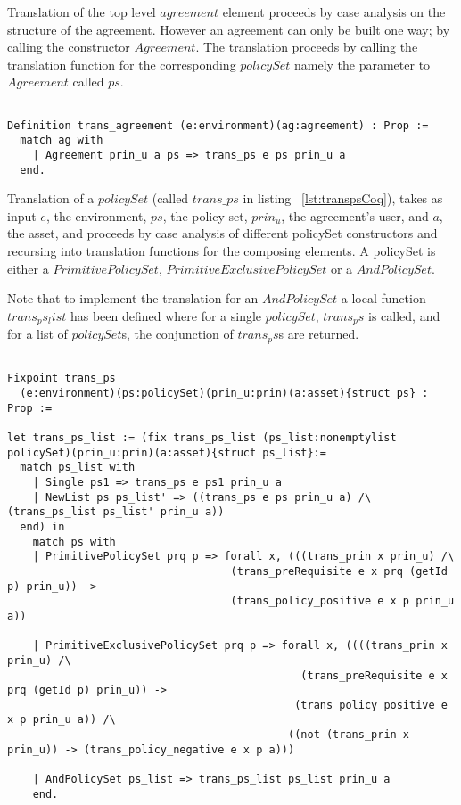 Translation of the top level $agreement$ element proceeds by case analysis on the structure of the agreement. However an agreement can only be built one way; by calling the constructor $Agreement$. The translation proceeds by calling the translation function for the corresponding $policySet$ namely the parameter to $Agreement$ called $ps$.


\begin{lstlisting}

Definition trans_agreement (e:environment)(ag:agreement) : Prop :=
  match ag with 
    | Agreement prin_u a ps => trans_ps e ps prin_u a
  end.

\end{lstlisting}

Translation of a $policySet$ (called $trans\_ps$ in listing ~\ref{lst:transpsCoq}), takes as input $e$, the environment, $ps$, the policy set, $prin_{u}$, the agreement's user, and $a$, the asset, and proceeds by case analysis of different policySet constructors and recursing into translation functions for the composing elements. A policySet is either a $PrimitivePolicySet$, $PrimitiveExclusivePolicySet$ or a $AndPolicySet$. 

Note that to implement the translation for an $AndPolicySet$ a local function $trans_ps_list$ has been defined where for a single $policySet$, $trans_ps$ is called, and for a list of $policySet$s, the conjunction of $trans_ps$s are returned.

\begin{minipage}{\linewidth}
\begin{lstlisting}

Fixpoint trans_ps
  (e:environment)(ps:policySet)(prin_u:prin)(a:asset){struct ps} : Prop :=

let trans_ps_list := (fix trans_ps_list (ps_list:nonemptylist policySet)(prin_u:prin)(a:asset){struct ps_list}:=
  match ps_list with
    | Single ps1 => trans_ps e ps1 prin_u a
    | NewList ps ps_list' => ((trans_ps e ps prin_u a) /\ (trans_ps_list ps_list' prin_u a))
  end) in
    match ps with
    | PrimitivePolicySet prq p => forall x, (((trans_prin x prin_u) /\ 
                                   (trans_preRequisite e x prq (getId p) prin_u)) -> 
                                   (trans_policy_positive e x p prin_u a))  

    | PrimitiveExclusivePolicySet prq p => forall x, ((((trans_prin x prin_u) /\ 
                                              (trans_preRequisite e x prq (getId p) prin_u)) -> 
                                             (trans_policy_positive e x p prin_u a)) /\
                                            ((not (trans_prin x prin_u)) -> (trans_policy_negative e x p a)))
                   
    | AndPolicySet ps_list => trans_ps_list ps_list prin_u a
    end.
\end{lstlisting}
\end{minipage}



